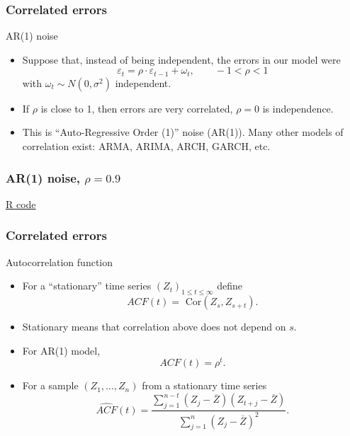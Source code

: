 \documentclass[handout]{beamer}
\begin{document}
   \begin{frame} \frametitle{Correlated errors}

   \begin{block}
   {AR(1) noise}
   \begin{itemize}

   \item Suppose that, instead of being independent, the errors in our model were
   $$
   \varepsilon_t = \rho \cdot \varepsilon_{t-1} + \omega_t, \qquad -1 < \rho < 1$$
   with $\omega_t \sim N(0,\sigma^2)$ independent.
   \item If $\rho$ is close to 1, then errors are very correlated, $\rho=0$ is independence.
   \item This is ``Auto-Regressive Order (1)'' noise (AR(1)). Many other
   models of correlation exist: ARMA, ARIMA, ARCH, GARCH, etc.
   \end{itemize}

   \end{block}
   \end{frame}



   \begin{frame}
   \frametitle{AR(1) noise, $\rho=0.9$}
   \begin{center}
   \end{center}
   \href{http://stats191.stanford.edu/correlated_errors.html#simulating-time-series}{R code}
   \end{frame}


   \begin{frame} \frametitle{Correlated errors}

   \begin{block}
   {Autocorrelation function                     }
   \begin{itemize}
   \item       For a ``stationary'' time series $(Z_t)_{1 \leq t \leq \infty}$
   define
   $$
   ACF(t) = \text{ Cor}(Z_s, Z_{s+t}).$$

   \item Stationary means that correlation above does not depend on $s$.

   \item For AR(1) model,
   $$
   ACF(t) = \rho^t.$$
       \item For a sample $(Z_1, \dots, Z_n)$ from a stationary time series
   $$
   \widehat{ACF}(t) = \frac{\sum_{j=1}^{n-t} (Z_j - \overline{Z})(Z_{t+j} - \overline{Z})}{\sum_{j=1}^n(Z_j - \overline{Z})^2}.$$

   \end{itemize}

   \end{block}
   \end{frame}
\end{document}
